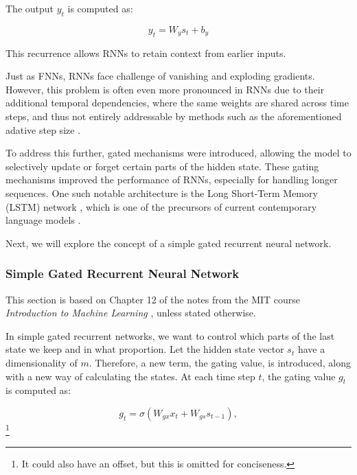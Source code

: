     The output \( y_t \) is computed as:  
    
    \begin{equation}
    y_t = W_y s_t + b_y
    \end{equation}
    
    This recurrence allows RNNs to retain context from earlier inputs. 
    
    \bigskip
    
    Just as FNNs, RNNs face challenge of vanishing and exploding gradients. However, this problem is often even more pronounced in RNNs due to their additional temporal dependencies, where the same weights are shared across time steps, and thus not entirely addressable by methods such as the aforementioned adative step size \cite{MITx6.036}.

    To address this further, gated mechanisms were introduced, allowing the model to selectively update or forget certain parts of the hidden state. These gating mechanisms improved the performance of RNNs, especially for handling longer sequences. One such notable architecture is the Long Short-Term Memory (LSTM) network \cite[Chapter 8]{MITx6.036}, which is one of the precursors of current contemporary language models \cite{vaswani2017attention}.

    Next, we will explore the concept of a simple gated recurrent neural network.
    \bigskip

    \subsubsection{Simple Gated Recurrent Neural Network}
    This section is based on Chapter 12 of the notes from the MIT course \textit{Introduction to Machine Learning} \cite[Chapter 12]{MITx6.036}, unless stated otherwise.
    
    In simple gated recurrent networks, we want to control which parts of the last state we keep and in what proportion. Let the hidden state vector \(s_t\) have a dimensionality of \(m\). Therefore, a new term, the gating value, is introduced, along with a new way of calculating the states. At each time step \( t \), the gating value \( g_t \) is computed as:
    
    \begin{equation}
    g_t = \sigma(W_{gx} x_t + W_{gs} s_{t-1}),
    \end{equation}
    \footnote{It could also have an offset, but this is omitted for conciseness.}
    
